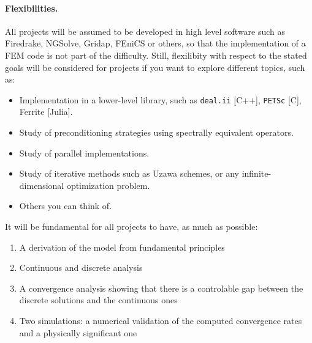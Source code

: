 \documentclass{article}
\begin{document}
\paragraph{\textbf{Flexibilities.}} All projects will be assumed to be developed in high level software such as Firedrake, NGSolve, Gridap, FEniCS or others, so that the implementation of a FEM code is not part of the difficulty. Still, flexilibity with respect to the stated goals will be considered for projects if you want to explore different topics, such as: 
\begin{itemize}
    \item Implementation in a lower-level library, such as \texttt{deal.ii} [C++], \texttt{PETSc} [C], Ferrite [Julia].
    \item Study of preconditioning strategies using spectrally equivalent operators.
    \item Study of parallel implementations.
    \item Study of iterative methods such as Uzawa schemes, or any infinite-dimensional optimization problem.
    \item Others you can think of.
\end{itemize}

It will be fundamental for all projects to have, as much as possible:
\begin{enumerate}
    \item A derivation of the model from fundamental principles
    \item Continuous and discrete analysis
    \item A convergence analysis showing that there is a controlable gap between the discrete solutions and the continuous ones
    \item Two simulations: a numerical validation of the computed convergence rates and a physically significant one
\end{enumerate}
\end{document}
